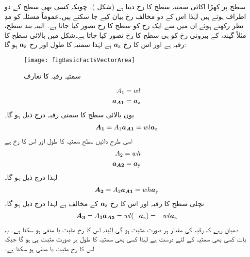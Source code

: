 سطح پر کھڑا  اکائی سمتیہ سطح کا رخ دیتا ہے (شکل )۔  چونکہ کسی بھی سطح  کے دو اطراف ہوتے ہیں لہٰذا اس کے دو مخالف  رخ بیان کیے جا سکتے ہیں۔عموماً مسئلہ کو مدِ نظر رکھتے ہوئے  ان میں سے ایک رخ  کو سطح کا رخ  تصور کیا جاتا ہے۔ البتہ بند سطح، مثلاً  گیند، کے بیرونی رخ کو ہی سطح کا رخ تصور کیا جاتا ہے۔شکل  میں بالائی  سطح   کا رقبہ  ہے اور اس کا رخ ${\boldsymbol{a}}_{\textup{z}}$ ہے لہٰذا   سمتیہ کا طول    اور رخ ${\boldsymbol{a}}_{\textup{z}}$ ہو گا:
\begin{figure}
\centering
\texttt{[image: figBasicFactsVectorArea]}
\caption{سمتیہ رقبہ کا تعارف‬}
\label{شکل_حقائق_رقبہ_سمتیہ}
\end{figure}
%
\begin{align*}
A_1&=wl\\
{{\boldsymbol{a_{A1}}}}&={\boldsymbol{a}}_{\textup{z}}
\end{align*}
یوں بالائی سطح کا سمتی رقبہ درج ذیل ہو گا۔
\begin{align}
{\ensuremath{{\boldsymbol{A_1}}}}=A_1 {{\boldsymbol{a_{A1}}}}= w l {\boldsymbol{a}}_{\textup{z}}
\end{align}
اسی طرح دائیں  سطح  سمتیہ  کا طول   اور اس کا رخ  ہے
\begin{align*}
A_2=wh\\
{{\boldsymbol{a_{A2}}}}={\boldsymbol{a}}_{\textup{y}}
\end{align*}
لہٰذا درج ذیل ہو گا۔
\begin{align}
{\ensuremath{{\boldsymbol{A_2}}}}=A_2 {{\boldsymbol{a_{A1}}}}=w h {\boldsymbol{a}}_{\textup{y}}
\end{align}
نچلی سطح کا رقبہ   اور اس کا رخ  ${\boldsymbol{a}}_{\textup{z}}$ کے مخالف  ہے لہٰذا درج ذیل ہو گا۔
\begin{align}
{\ensuremath{{\boldsymbol{A_3}}}}=A_3 {{\boldsymbol{a_{A3}}}}=wl (-{\boldsymbol{a}}_{\textup{z}})=-wl {\boldsymbol{a}}_{\textup{z}}
\end{align}
دھیان  رہے کہ رقبہ کی مقدار ہر صورت  مثبت ہو گی البتہ اس کا رخ مثبت یا منفی ہو سکتا ہے۔ یہ بات کسی بھی سمتیہ کے لئے درست ہے لہٰذا کسی بھی سمتیہ کا طول ہر صورت  مثبت ہی ہو گا جبکہ  اس کا رخ  مثبت یا منفی ہو سکتا  ہے۔

